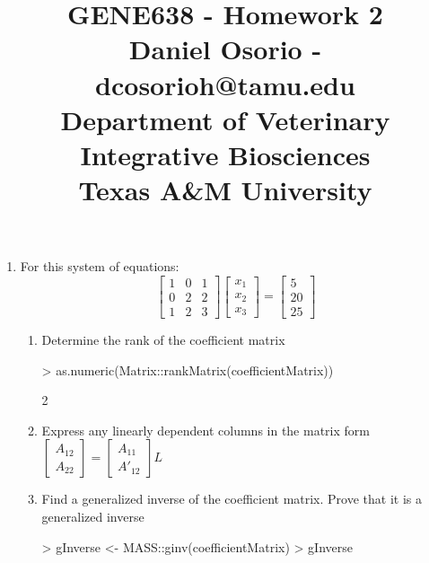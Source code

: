 \documentclass[12pt,a4paper]{paper}
\begin{document}
\title{GENE638 - Homework 2\\\small{Daniel Osorio - dcosorioh@tamu.edu\\Department of Veterinary Integrative Biosciences\\Texas A\&M University}}
\maketitle

\begin{enumerate}
\item For this system of equations:\[\left[\begin{array}{ccc}1 & 0 & 1 \\ 0 & 2 & 2 \\ 1 & 2 & 3\end{array}\right]\left[\begin{array}{c}x_{1} \\ x_{2} \\ x_{3}\end{array}\right]=\left[\begin{array}{c}5 \\ 20 \\ 25\end{array}\right]\]
\begin{enumerate}
\item Determine the rank of the coefficient matrix
\begin{Schunk}
\begin{Sinput}
> as.numeric(Matrix::rankMatrix(coefficientMatrix))
\end{Sinput}
\begin{Soutput}
[1] 2
\end{Soutput}
\end{Schunk}
\item Express any linearly dependent columns in the matrix form $\left[\begin{array}{c}A_{12}\\A_{22}\end{array}\right]=\left[\begin{array}{c}A_{11}\\A'_{12}\end{array}\right]L$
\item Find a generalized inverse of the coefficient matrix. Prove that it is a generalized inverse
\begin{Schunk}
\begin{Sinput}
> gInverse <- MASS::ginv(coefficientMatrix)
> gInverse
\end{Sinput}

\end{Schunk}
\end{enumerate}
\end{enumerate}
\end{document}
